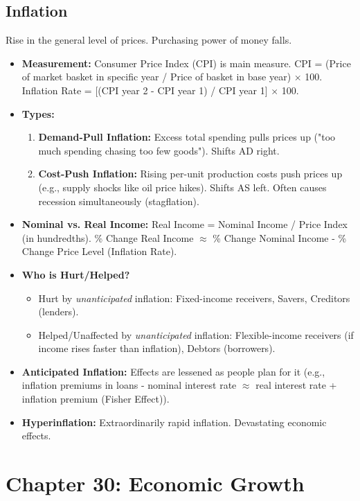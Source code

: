 \documentclass{article}
\begin{document}
\subsection*{Inflation}
Rise in the general level of prices. Purchasing power of money falls.
\begin{itemize}
    \item \textbf{Measurement:} Consumer Price Index (CPI) is main measure. CPI = (Price of market basket in specific year / Price of basket in base year) $\times$ 100. Inflation Rate = [(CPI year 2 - CPI year 1) / CPI year 1] $\times$ 100.
    \item \textbf{Types:}
        \begin{enumerate}
            \item \textbf{Demand-Pull Inflation:} Excess total spending pulls prices up ("too much spending chasing too few goods"). Shifts AD right.
            \item \textbf{Cost-Push Inflation:} Rising per-unit production costs push prices up (e.g., supply shocks like oil price hikes). Shifts AS left. Often causes recession simultaneously (stagflation).
        \end{enumerate}
    \item \textbf{Nominal vs. Real Income:} Real Income = Nominal Income / Price Index (in hundredths). \% Change Real Income $\approx$ \% Change Nominal Income - \% Change Price Level (Inflation Rate).
    \item \textbf{Who is Hurt/Helped?}
        \begin{itemize}
            \item Hurt by \textit{unanticipated} inflation: Fixed-income receivers, Savers, Creditors (lenders).
            \item Helped/Unaffected by \textit{unanticipated} inflation: Flexible-income receivers (if income rises faster than inflation), Debtors (borrowers).
        \end{itemize}
    \item \textbf{Anticipated Inflation:} Effects are lessened as people plan for it (e.g., inflation premiums in loans - nominal interest rate $\approx$ real interest rate + inflation premium (Fisher Effect)).
    \item \textbf{Hyperinflation:} Extraordinarily rapid inflation. Devastating economic effects.
\end{itemize}

\section*{Chapter 30: Economic Growth}
\end{document}
